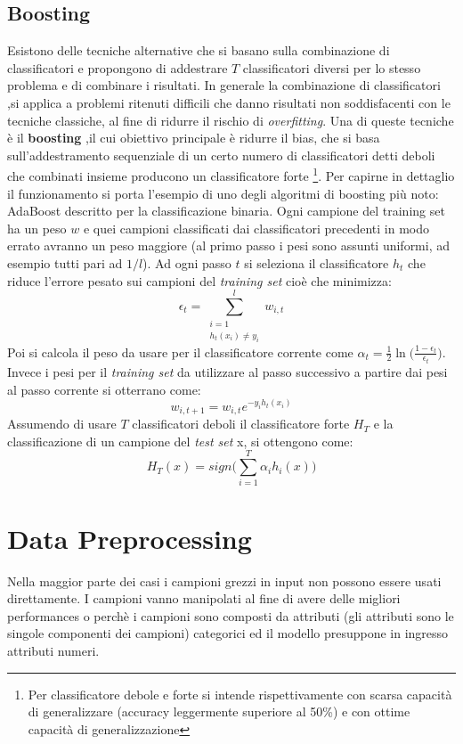\subsection{Boosting}
\label{sub:boost}
Esistono delle tecniche alternative che si basano sulla combinazione di classificatori e propongono di addestrare $T$ classificatori diversi per lo stesso problema e di combinare i risultati. In generale la combinazione di classificatori ,si applica a problemi ritenuti difficili che danno risultati non soddisfacenti con le tecniche classiche, al fine di ridurre il rischio di \textit{overfitting}. Una di queste tecniche è il \textbf{boosting} ,il cui obiettivo principale è ridurre il bias,  che si basa sull'addestramento sequenziale di un certo numero di classificatori detti deboli  che combinati insieme producono un classificatore forte \footnote{Per classificatore debole e forte si intende rispettivamente con scarsa capacità di generalizzare (accuracy leggermente superiore al 50\%) e con ottime capacità di generalizzazione}. Per capirne in dettaglio il funzionamento si porta l'esempio di uno degli algoritmi di boosting più noto: AdaBoost descritto per la classificazione binaria. Ogni campione del training set ha un peso $w$ e quei campioni classificati  dai classificatori precedenti in modo errato avranno un peso maggiore (al primo passo i pesi sono assunti uniformi, ad esempio tutti pari ad $1/l$). Ad ogni passo $t$ si seleziona il classificatore $h_t$ che riduce l'errore pesato sui campioni del \textit{training set} cioè che minimizza:
\begin{equation*}
\epsilon_t = \sum_{\substack{i=1 \\ h_{t}(x_{i}) \neq y_{i}}}^{l}w_{i,t}
\end{equation*}
 Poi si calcola il peso da usare per il classificatore corrente come $\alpha_t = \frac{1}{2}\ln \bigl(\frac{1-\epsilon_t}{\epsilon_t}\bigl)$. Invece i pesi per il \textit{training set} da utilizzare al passo successivo a partire dai pesi al passo corrente si otterrano come:
 \begin{equation*}
 w_{i,t+1} = w_{i,t}e^{-y_{i}h_{t}(x_{i})}
 \end{equation*}
Assumendo di usare $T$ classificatori deboli il classificatore forte $H_T$ e la classificazione di un campione del \textit{test set} x, si ottengono come:
\begin{equation*}
H_{T}(x) = sign\Biggl(\sum_{i=1}^{T}\alpha_ih_i(x)\Biggl)
\end{equation*}

\section{Data Preprocessing}
Nella maggior parte dei casi i campioni grezzi in input non possono essere usati direttamente. I campioni vanno manipolati al fine di avere delle migliori performances o perchè i campioni sono composti da attributi (gli attributi sono le singole componenti dei campioni) categorici ed il modello presuppone in ingresso attributi numeri. 
